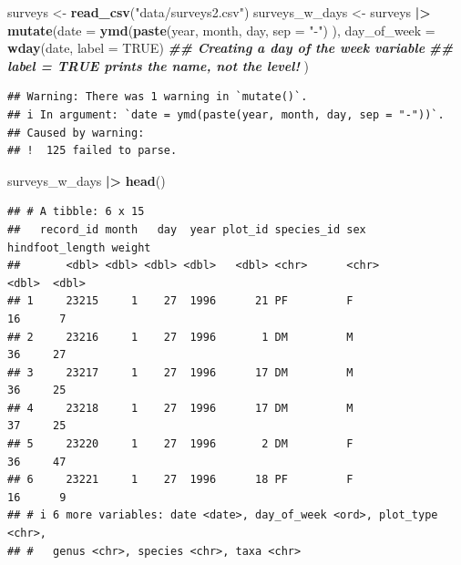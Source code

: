 \documentclass[
  10pt,
  letterpaper,
  twoside,
  openright]{book}
\newenvironment{Shaded}{\begin{snugshade}}{\end{snugshade}}
\newcommand{\AttributeTok}[1]{\textcolor[rgb]{0.13,0.29,0.53}{#1}}
\newcommand{\ConstantTok}[1]{\textcolor[rgb]{0.56,0.35,0.01}{#1}}
\newcommand{\DocumentationTok}[1]{\textcolor[rgb]{0.56,0.35,0.01}{\textbf{\textit{#1}}}}
\newcommand{\FunctionTok}[1]{\textcolor[rgb]{0.13,0.29,0.53}{\textbf{#1}}}
\newcommand{\NormalTok}[1]{#1}
\newcommand{\OtherTok}[1]{\textcolor[rgb]{0.56,0.35,0.01}{#1}}
\newcommand{\SpecialCharTok}[1]{\textcolor[rgb]{0.81,0.36,0.00}{\textbf{#1}}}
\newcommand{\StringTok}[1]{\textcolor[rgb]{0.31,0.60,0.02}{#1}}
\begin{document}
\begin{Shaded}
\begin{Highlighting}[]
\NormalTok{surveys }\OtherTok{\textless{}{-}} \FunctionTok{read\_csv}\NormalTok{(}\StringTok{"data/surveys2.csv"}\NormalTok{)}
\NormalTok{surveys\_w\_days }\OtherTok{\textless{}{-}}\NormalTok{ surveys }\SpecialCharTok{|\textgreater{}} 
  \FunctionTok{mutate}\NormalTok{(}\AttributeTok{date =} \FunctionTok{ymd}\NormalTok{(}\FunctionTok{paste}\NormalTok{(year,}
\NormalTok{                          month,}
\NormalTok{                          day,}
                          \AttributeTok{sep =} \StringTok{"{-}"}\NormalTok{)}
\NormalTok{                    ),}
         \AttributeTok{day\_of\_week =} \FunctionTok{wday}\NormalTok{(date, }\AttributeTok{label =} \ConstantTok{TRUE}\NormalTok{)}
         \DocumentationTok{\#\# Creating a day of the week variable}
         \DocumentationTok{\#\# label = TRUE prints the name, not the level! }
\NormalTok{         )}
\end{Highlighting}
\end{Shaded}

\begin{verbatim}
## Warning: There was 1 warning in `mutate()`.
## i In argument: `date = ymd(paste(year, month, day, sep = "-"))`.
## Caused by warning:
## !  125 failed to parse.
\end{verbatim}

\begin{Shaded}
\begin{Highlighting}[]
\NormalTok{surveys\_w\_days }\SpecialCharTok{|\textgreater{}}
  \FunctionTok{head}\NormalTok{()}
\end{Highlighting}
\end{Shaded}

\begin{verbatim}
## # A tibble: 6 x 15
##   record_id month   day  year plot_id species_id sex   hindfoot_length weight
##       <dbl> <dbl> <dbl> <dbl>   <dbl> <chr>      <chr>           <dbl>  <dbl>
## 1     23215     1    27  1996      21 PF         F                  16      7
## 2     23216     1    27  1996       1 DM         M                  36     27
## 3     23217     1    27  1996      17 DM         M                  36     25
## 4     23218     1    27  1996      17 DM         M                  37     25
## 5     23220     1    27  1996       2 DM         F                  36     47
## 6     23221     1    27  1996      18 PF         F                  16      9
## # i 6 more variables: date <date>, day_of_week <ord>, plot_type <chr>,
## #   genus <chr>, species <chr>, taxa <chr>
\end{verbatim}
\end{document}

